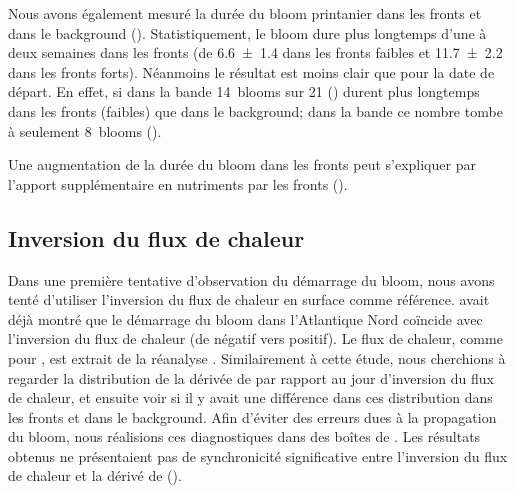 Nous avons également mesuré la durée du bloom printanier dans les fronts et dans le background ().
Statistiquement, le bloom dure plus longtemps d'une à deux semaines dans les fronts (de \qty{6.6 \pm 1.4}{\jours} dans les fronts faibles et \qty{11.7 \pm 2.2}{\jours} dans les fronts forts).
Néanmoins le résultat est moins clair que pour la date de départ.
En effet, si dans la bande  14~blooms sur 21 () durent plus longtemps dans les fronts (faibles) que dans le background; dans la bande  ce nombre tombe à seulement 8~blooms ().

\begin{figure}
  \centering
  \label{fig:duree-bloom}
\end{figure}

Une augmentation de la durée du bloom dans les fronts peut s'expliquer par l'apport supplémentaire en nutriments par les fronts (\cite{simoes-sousa_2022}).

\subsection{Inversion du flux de chaleur}
\label{sec:flux-chaleur}

Dans une première tentative d'observation du démarrage du bloom, nous avons tenté d'utiliser l'inversion du flux de chaleur en surface comme référence.
\Textcite{ferrari_2015} avait déjà montré que le démarrage du bloom dans l'Atlantique Nord  coïncide avec l'inversion du flux de chaleur (de négatif vers positif).
Le flux de chaleur, comme pour \textcite{ferrari_2015}, est extrait de la réanalyse  .
Similairement à cette étude, nous cherchions à regarder la distribution de la dérivée de  par rapport au jour d'inversion du flux de chaleur, et ensuite voir si il y avait une différence dans ces distribution dans les fronts et dans le background.
Afin d'éviter des erreurs dues à la propagation du bloom, nous réalisions ces diagnostiques dans des boîtes de .
Les résultats obtenus ne présentaient pas de synchronicité significative entre l'inversion du flux de chaleur et la dérivé de  ().

